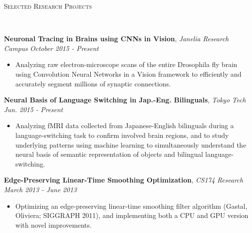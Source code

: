 \documentclass[9pt]{article}
\newenvironment{changemargin}[2]{%
  \begin{list}{}{%
    \setlength{\topsep}{0pt}%
    \setlength{\leftmargin}{#1}%
    \setlength{\rightmargin}{#2}%
    \setlength{\listparindent}{\parindent}%
    \setlength{\itemindent}{\parindent}%
    \setlength{\parsep}{\parskip}%
  }%
  \item[]}{\end{list}
}
\newcommand{\lineover}{
	\begin{changemargin}{-0.05in}{-0.05in}
		\vspace*{-8pt}
		\hrulefill \\
		\vspace*{-2pt}
	\end{changemargin}
}
\newcommand{\header}[1]{
	\begin{changemargin}{-0.5in}{-0.5in}
		\scshape{#1}\\
  	\lineover
	\end{changemargin}
}
\newenvironment{body} {
	\vspace*{-16pt}
	\begin{changemargin}{-0.25in}{-0.5in}
  }	
	{\end{changemargin}
}
\begin{document}
\header{Selected Research Projects}
\begin{body}
	\vspace{16pt}
	\textbf{Neuronal Tracing in Brains using CNNs in Vision}, \emph{Janelia Research Campus} \hfill \emph{October 2015 - Present}
	\vspace*{-3pt}
	\begin{itemize} \itemsep -0pt
	\item Analyzing raw electron-microscope scans of the entire Drosophila fly brain using Convolution Neural Networks in a Vision framework to efficiently and accurately segment millions of synaptic connections.
	\end{itemize}
	\vspace*{-3pt}
	\textbf{Neural Basis of Language Switching in Jap.-Eng. Bilinguals}, \emph{Tokyo Tech} \hfill \emph{Jun. 2015 - Present} \\
		\vspace*{-3pt}
	\begin{itemize} \itemsep -0pt
	\item Analyzing fMRI data collected from Japanese-English bilinguals during a language-switching task to confirm involved brain regions, and to study underlying patterns using machine learning to simultaneously understand the neural basis of semantic representation of objects and bilingual language-switching.
	\end{itemize}
	\vspace{-3pt}
		\vspace*{-1pt}
	\textbf{Edge-Preserving Linear-Time Smoothing Optimization}, \emph{CS174 Research} \hfill \emph{March 2013 - June 2013} \\
		\vspace*{-3pt}
	\begin{itemize} \itemsep -0pt
		\item Optimizing an edge-preserving linear-time smoothing filter algorithm (Gastal, Oliviera; SIGGRAPH 2011), and implementing both a CPU and GPU version with novel improvements.

\end{itemize}
\end{body}
\end{document}
